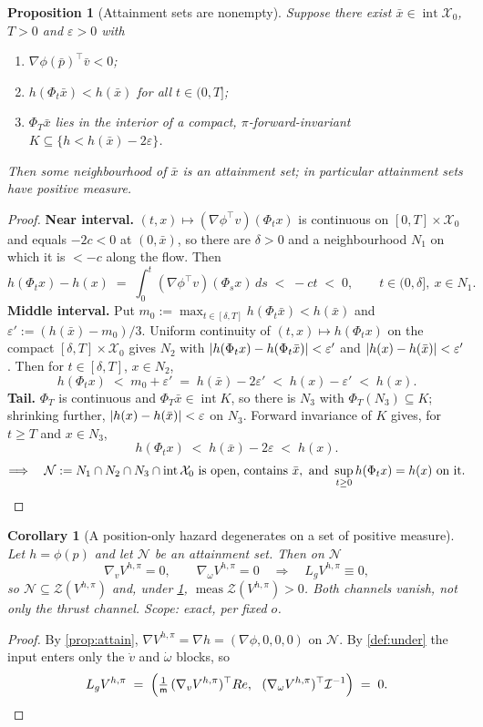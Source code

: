 \documentclass[11pt]{article}
\theoremstyle{plain}
\newtheorem{proposition}[theorem]{Proposition}
\newtheorem{corollary}[theorem]{Corollary}
\theoremstyle{definition}
\theoremstyle{remark}
\DeclarePairedDelimiter{\abs}{\lvert}{\rvert}
\newcommand{\calX}{\mathcal{X}}
\newcommand{\Vhp}[1]{V^{h,#1}}
\newcommand{\Vhpi}{\Vhp{\pi}}
\newcommand{\mass}{\mathsf m}
\newcommand{\inertia}{\mathcal I}
\newcommand{\Lg}{L_g}
\newcommand{\grad}{\nabla}
\newcommand{\eqdef}{:=}
\begin{document}
\begin{proposition}[Attainment sets are nonempty]\label{prop:attain-exists}
Suppose there exist $\bar x\in\operatorname{int}\calX_0$, $T>0$ and $\varepsilon>0$ with
\begin{enumerate}[label=(\roman*)]
  \item $\grad\phi(\bar p)^\top\bar v<0$;
  \item $h(\Phi_t\bar x)<h(\bar x)$ for all $t\in(0,T]$;
  \item $\Phi_T\bar x$ lies in the interior of a compact, $\pi$-forward-invariant
  $K\subseteq\{h<h(\bar x)-2\varepsilon\}$.
\end{enumerate}
Then some neighbourhood of $\bar x$ is an attainment set; in particular attainment sets have
positive measure.
\end{proposition}
\begin{proof}
\textbf{Near interval.} $(t,x)\mapsto(\grad\phi^\top v)(\Phi_tx)$ is continuous on
$[0,T]\times\calX_0$ and equals $-2c<0$ at $(0,\bar x)$, so there are $\delta>0$ and a
neighbourhood $N_1$ on which it is $<-c$ along the flow. Then
\[
h(\Phi_tx)-h(x)\;=\;\int_0^t(\grad\phi^\top v)(\Phi_sx)\,ds\;<\;-ct\;<\;0,
\qquad t\in(0,\delta],\ x\in N_1 .
\]
\textbf{Middle interval.} Put $m_0\eqdef\max_{t\in[\delta,T]}h(\Phi_t\bar x)<h(\bar x)$ and
$\varepsilon'\eqdef(h(\bar x)-m_0)/3$. Uniform continuity of $(t,x)\mapsto h(\Phi_tx)$ on the
compact $[\delta,T]\times\calX_0$ gives $N_2$ with
$\abs{h(\Phi_tx)-h(\Phi_t\bar x)}<\varepsilon'$ and $\abs{h(x)-h(\bar x)}<\varepsilon'$. Then
for $t\in[\delta,T]$, $x\in N_2$,
\[
h(\Phi_tx)\;<\;m_0+\varepsilon'\;=\;h(\bar x)-2\varepsilon'\;<\;h(x)-\varepsilon'\;<\;h(x).
\]
\textbf{Tail.} $\Phi_T$ is continuous and $\Phi_T\bar x\in\operatorname{int}K$, so there is
$N_3$ with $\Phi_T(N_3)\subseteq K$; shrinking further, $\abs{h(x)-h(\bar x)}<\varepsilon$ on
$N_3$. Forward invariance of $K$ gives, for $t\ge T$ and $x\in N_3$,
\[
h(\Phi_tx)\;<\;h(\bar x)-2\varepsilon\;<\;h(x).
\]
\[
\Longrightarrow\quad \mathcal N\eqdef N_1\cap N_2\cap N_3\cap\operatorname{int}\calX_0
\ \text{is open, contains }\bar x,\ \text{and }\sup_{t\ge0}h(\Phi_tx)=h(x)\ \text{on it.}\qedhere
\]
\end{proof}

\begin{corollary}[A position-only hazard degenerates on a set of positive measure]\label{cor:degen-pos}
Let $h=\phi(p)$ and let $\mathcal N$ be an attainment set. Then on $\mathcal N$
\[
\grad_v\Vhpi=0,\qquad \grad_\omega\Vhpi=0
\quad\Longrightarrow\quad \Lg\Vhpi\equiv0 ,
\]
so $\mathcal N\subseteq\mathcal Z(\Vhpi)$ and, under \cref{prop:attain-exists},
$\operatorname{meas}\mathcal Z(\Vhpi)>0$. \emph{Both} channels vanish, not only the thrust
channel. Scope: exact, per fixed $o$.
\end{corollary}
\begin{proof}
By \cref{prop:attain}, $\grad\Vhpi=\grad h=(\grad\phi,0,0,0)$ on $\mathcal N$. By
\cref{def:under} the input enters only the $\dot v$ and $\dot\omega$ blocks, so
\[
\Lg\Vhpi\;=\;\Big(\tfrac1{\mass}\,(\grad_v\Vhpi)^\top Re,\ \ (\grad_\omega\Vhpi)^\top\inertia^{-1}\Big)\;=\;0 . \qedhere
\]
\end{proof}
\end{document}
